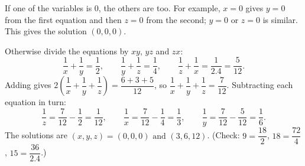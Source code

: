 If one of the variables is $0$, the others are too. For example, $x=0$ gives $y=0$ from the first equation and then $z=0$ from the second; $y=0$ or $z=0$ is similar. This gives the solution $(0,0,0)$.

Otherwise divide the equations by $xy$, $yz$ and $zx$:
\[\dfrac1x+\dfrac1y=\dfrac12,\qquad\dfrac1y+\dfrac1z=\dfrac14,\qquad\dfrac1z+\dfrac1x=\dfrac{1}{2.4}=\dfrac5{12}.\]
Adding gives $2\left(\dfrac1x+\dfrac1y+\dfrac1z\right)=\dfrac{6+3+5}{12}$, so $\dfrac1x+\dfrac1y+\dfrac1z=\dfrac7{12}$. Subtracting each equation in turn:
\[\dfrac1z=\dfrac7{12}-\dfrac12=\dfrac1{12},\qquad\dfrac1x=\dfrac7{12}-\dfrac14=\dfrac13,\qquad\dfrac1y=\dfrac7{12}-\dfrac5{12}=\dfrac16.\]
The solutions are $\boxed{(x,y,z)=(0,0,0)\text{ and }(3,6,12)}$. (Check: $9=\dfrac{18}{2}$, $18=\dfrac{72}{4}$, $15=\dfrac{36}{2.4}$.)
